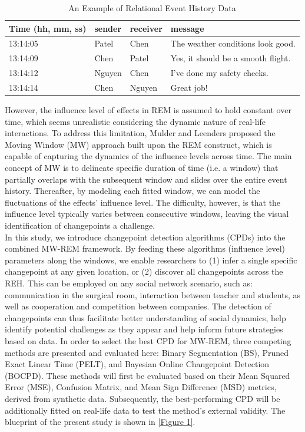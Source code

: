 \documentclass[]{interact}
\theoremstyle{plain}%
\theoremstyle{definition}
\theoremstyle{remark}
\begin{document}
{	\begin{table}[h]
		\begin{tabular}{llll}
			\hline
			Time (hh,  mm, ss) & sender & receiver & message                                  \\ \hline
			13:14:05           & Patel  & Chen     & The weather conditions look good.        \\
			13:14:09           & Chen   & Patel    & Yes, it should be a smooth flight.       \\
			13:14:12           & Nguyen & Chen     & I've done my safety checks.              \\
			13:14:14           & Chen   & Nguyen   & Great job!                               \\ \hline
		\end{tabular}
	\caption{An Example of Relational Event History Data}
	\label{Table 1}
	\end{table}

	However, the influence level of effects in REM is assumed to hold constant over time, which seems unrealistic considering the dynamic nature of real-life interactions. To address this limitation, Mulder and Leenders \cite{mulderModelingEvolutionInteraction2019} proposed the Moving Window (MW) approach built upon the REM construct, which is capable of capturing the dynamics of the influence levels across time. The main concept of MW is to delineate specific duration of time (i.e. a window) that partially overlaps with the subsequent window and slides over the entire event history. Thereafter, by modeling each fitted window, we can model the fluctuations of the effects' influence level. The difficulty, however, is that the influence level typically varies between consecutive windows, leaving the visual identification of changepoints a challenge. \\
	
	In this study, we introduce changepoint detection algorithms (CPDs) into the combined MW-REM framework. By feeding these algorithms (influence level) parameters along the windows, we enable researchers to (1) infer a single specific changepoint at any given location, or (2) discover all changepoints across the REH. This can be employed on any social network scenario, such as: communication in the surgical room, interaction between teacher and students, as well as cooperation and competition between companies. The detection of changepoints can thus facilitate better understanding of social dynamics, help identify potential challenges as they appear and help inform future strategies based on data. In order to select the best CPD for MW-REM, three competing methods are presented and evaluated here: Binary Segmentation (BS), Pruned Exact Linear Time (PELT), and Bayesian Online Changepoint Detection (BOCPD). These methods will first be evaluated based on their Mean Squared Error (MSE), Confusion Matrix, and Mean Sign Difference (MSD) metrics, derived from synthetic data. Subsequently, the best-performing CPD will be additionally fitted on real-life data to test the method's external validity. The blueprint of the present study is shown in \autoref{Figure 1}. \\
	
}
\end{document}
